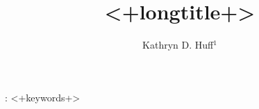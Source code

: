 \documentclass[12pt]{iopart}
\begin{document}
\title[<+shorttitle+>]{<+longtitle+>}
\author{Kathryn D. Huff$^1$}
\address{$^1$University of California Berkeley}


\begin{abstract}
  
\end{abstract}

\vspace{2pc}
: <+keywords+>

\maketitle



\end{document}
